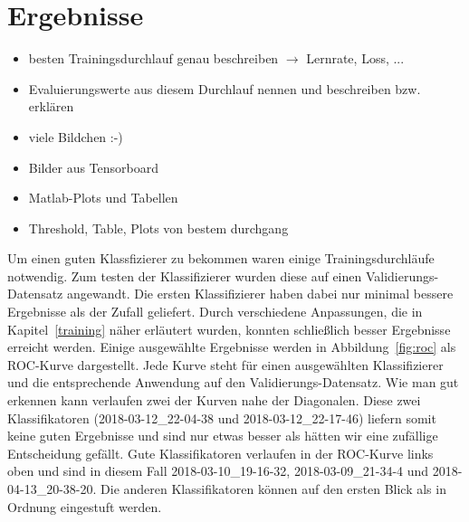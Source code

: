 \section{Ergebnisse}
\color{red}
\begin{itemize}
	\item besten Trainingsdurchlauf genau beschreiben $\rightarrow$ Lernrate, Loss, ...
	\item Evaluierungswerte aus diesem Durchlauf nennen und beschreiben bzw. erklären
	\item viele Bildchen :-) 
	\item Bilder aus Tensorboard
	\item Matlab-Plots und Tabellen 
    \item Threshold, Table, Plots von bestem durchgang
\end{itemize}
\color{black}

Um einen guten Klassfizierer zu bekommen waren einige Trainingsdurchläufe notwendig. Zum testen der Klassifizierer wurden diese auf einen Validierungs-Datensatz angewandt. Die ersten Klassifizierer haben dabei nur minimal bessere Ergebnisse als der Zufall geliefert. Durch verschiedene Anpassungen, die in Kapitel~\ref{training} näher erläutert wurden, konnten schließlich besser Ergebnisse erreicht werden. Einige ausgewählte Ergebnisse werden in Abbildung~\ref{fig:roc} als ROC-Kurve dargestellt. Jede Kurve steht für einen ausgewählten Klassifizierer und die entsprechende Anwendung auf den Validierungs-Datensatz. Wie man gut erkennen kann verlaufen zwei der Kurven nahe der Diagonalen. Diese zwei Klassifikatoren (2018-03-12\_22-04-38 und 2018-03-12\_22-17-46) liefern somit keine guten Ergebnisse und sind nur etwas besser als hätten wir eine zufällige Entscheidung gefällt. Gute Klassifikatoren verlaufen in der ROC-Kurve links oben und sind in diesem Fall 2018-03-10\_19-16-32, 2018-03-09\_21-34-4 und 2018-04-13\_20-38-20. Die anderen Klassifikatoren können auf den ersten Blick als in Ordnung eingestuft werden.

